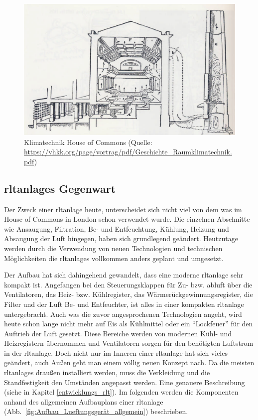 \begin{figure}[ht]
	\centering
	\includegraphics[width=1\linewidth]{Bilder/Belueftung_House_of_Commons}
	\caption{Klimatechnik House of Commons  (Quelle: \url{https://vhkk.org/page/vortrag/pdf/Geschichte_Raumklimatechnik.pdf})}
	\label{fig:House_of_Commons_Klimatechnik}
\end{figure}



\subsection{\Acp{rltanlage} Gegenwart}
Der Zweck einer \ac{rltanlage} heute, unterscheidet sich nicht viel von dem was  im House of Commons in London schon verwendet wurde. Die einzelnen Abschnitte wie \zB Ansaugung, Filtration, Be- und Entfeuchtung, Kühlung, Heizung und Absaugung der Luft hingegen, haben sich grundlegend geändert. Heutzutage werden durch die Verwendung von neuen Technologien und technischen Möglichkeiten die \acp{rltanlage} vollkommen anders geplant und umgesetzt.

Der Aufbau hat sich dahingehend gewandelt, dass eine moderne \ac{rltanlage} sehr kompakt ist. Angefangen bei den Steuerungsklappen für Zu- bzw. \gls{abluft} über die Ventilatoren, das Heiz- bzw. Kühlregister, das Wärmerückgewinnungsregister, die Filter und der Luft Be- und Entfeuchter, ist alles in einer kompakten \ac{rltanlage} untergebracht. Auch was die zuvor angesprochenen Technologien angeht, wird heute schon lange nicht mehr auf Eis als Kühlmittel oder ein \enquote{Lockfeuer} für den Auftrieb der Luft gesetzt. Diese Bereiche werden \zB von modernen Kühl- und Heizregistern übernommen und Ventilatoren sorgen für den benötigten Luftstrom in der \ac{rltanlage}. Doch nicht nur im Inneren einer \ac{rltanlage} hat sich vieles geändert, auch Außen geht man einem völlig neuen Konzept nach. Da die meisten \acp{rltanlage} draußen installiert werden, muss die Verkleidung und die Standfestigkeit den Umständen angepasst werden. Eine genauere Beschreibung (siehe in Kapitel \ref{entwicklungs_rlt}).
Im folgenden werden die Komponenten anhand des allgemeinen Aufbauplans einer \ac{rltanlage} (Abb.~\ref{fig:Aufbau_Lueftungsgerät_allgemein}) beschrieben. 

